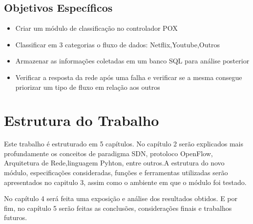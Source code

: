 \subsection{Objetivos Específicos}

\begin{itemize}
\item Criar um módulo de classificação no controlador POX
\item Classificar em 3 categorias o fluxo de dados: Netflix,Youtube,Outros
\item Armazenar as informações coletadas em um banco SQL para análise posterior
\item Verificar a resposta da rede após uma falha e verificar se a mesma consegue priorizar um tipo de fluxo em relação aos outros
\end{itemize}
\section{Estrutura do Trabalho}
Este trabalho é estruturado em 5 capítulos. No capítulo 2 serão explicados mais profundamente os conceitos de paradigma SDN, protoloco OpenFlow, Arquitetura de Rede,linguagem Pyhton, entre outros.A estrutura do novo módulo, especificações consideradas, funções e ferramentas utilizadas serão apresentados no capitulo 3, assim como o ambiente em que o módulo foi testado.


No capítulo 4 será feita uma exposição e análise dos resultados obtidos. E por fim, no capítulo 5 serão feitas as conclusões, considerações finais e trabalhos futuros.




